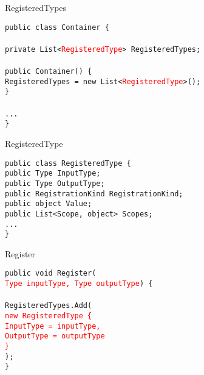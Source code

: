 \documentclass{beamer}
\newcommand{\code}[1]{{\texttt{#1}}}
\begin{document}
\begin{frame}{RegisteredTypes}
     \begin{large}
	\code{public class Container \{}\\
	\code{}\\ \quad
		\code{private List<\textcolor{red}{RegisteredType}> RegisteredTypes;}\\ \quad
		\code{}\\ \quad
		\code{public Container() \{}\\ \qquad
		\code{RegisteredTypes = new List<\textcolor{red}{RegisteredType}>();}\\ \quad
		\code{\}}\\  \quad
		\code{}\\ \quad
		\code{...}\\
	\code{\}}
     \end{large}
\end{frame}

\begin{frame}{RegisteredType}
     \begin{large}
	\code{public class RegisteredType \{}\\  \quad
		\code{public Type InputType;}\\ \quad
		\code{public Type OutputType;}\\ \quad
		\code{public RegistrationKind RegistrationKind;}\\ \quad
		\code{public object Value;}\\ \quad
		\code{public List<Scope, object> Scopes;}\\ \quad
		\code{...}\\
	\code{\}}
     \end{large}
\end{frame}

\begin{frame}{Register}
     \begin{large}
	\code{public void Register(}\\ \quad
	\code{\textcolor{red}{Type inputType, Type outputType}) \{}\\ \quad
		\code{}\\ \quad
		\code{RegisteredTypes.Add(}\\ \qquad
		\code{\textcolor{red}{new RegisteredType \{}}\\ \qquad \quad
 		\code{\textcolor{red}{InputType = inputType,}}\\ \qquad \quad
		\code{\textcolor{red}{OutputType = outputType}}\\ \qquad
		\code{\textcolor{red}{\}}}\\ \quad
		\code{);}\\
	\code{\}}
     \end{large}
\end{frame}
\end{document}
